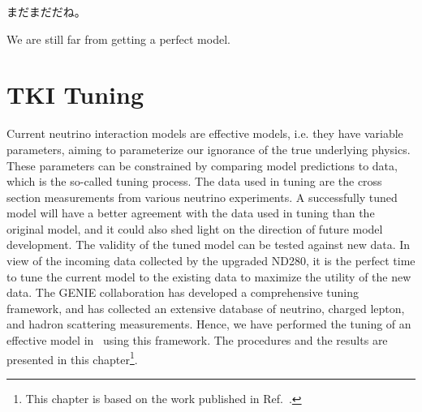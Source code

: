 \begin{savequote}[8cm]
\begin{CJK*}{UTF8}{min}
まだまだだね。
\end{CJK*}

We are still far from getting a perfect model.
\end{savequote}

\chapter{\label{ch:tuning}TKI Tuning}

\minitoc

Current neutrino interaction models are effective models, i.e. they have variable parameters, aiming to parameterize our ignorance of the true underlying physics.
These parameters can be constrained by comparing model predictions to data, which is the so-called tuning process.
The data used in tuning are the cross section measurements from various neutrino experiments.
A successfully tuned model will have a better agreement with the data used in tuning than the original model, and it could also shed light on the direction of future model development.
The validity of the tuned model can be tested against new data.
In view of the incoming data collected by the upgraded ND280, it is the perfect time to tune the current model to the existing data to maximize the utility of the new data.
The GENIE collaboration has developed a comprehensive tuning framework, and has collected an extensive database of neutrino, charged lepton, and hadron scattering measurements. 
Hence, we have performed the tuning of an effective model in \genie\ using this framework.
The procedures and the results are presented in this chapter\footnote{This chapter is based on the work published in Ref.~\cite{GENIE:2024ufm}.}.

